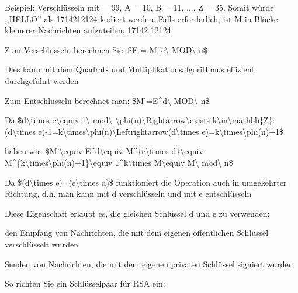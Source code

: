 \documentclass[a4paper]{article}
\begin{document}
\begin{multicols}{3}
\begin{itemize*}
            \begin{itemize*}
                  \item Beispiel: Verschlüsseln mit = 99, A = 10, B = 11, ..., Z = 35. Somit würde ,,HELLO'' als 1714212124 kodiert werden. Falls erforderlich, ist M in Blöcke kleinerer Nachrichten aufzuteilen: 17142 12124
            \end{itemize*}
            \item
            Zum Verschlüsseln berechnen Sie: \$E = M\^{}e\textbackslash{}
            MOD\textbackslash{} n\$

            \begin{itemize*}
                  \item Dies kann mit dem Quadrat- und Multiplikationsalgorithmus effizient durchgeführt werden
            \end{itemize*}
            \item
            Zum Entschlüsseln berechnet man: \$M'=E\^{}d\textbackslash{}
            MOD\textbackslash{} n\$

            \begin{itemize*}
                  \item Da \$d\textbackslash times e\textbackslash equiv 1\textbackslash{} mod\textbackslash{} \textbackslash phi(n)\textbackslash Rightarrow\textbackslash exists k\textbackslash in\textbackslash mathbb\{Z\}:(d\textbackslash times e)-1=k\textbackslash times\textbackslash phi(n)\textbackslash Leftrightarrow(d\textbackslash times e)=k\textbackslash times\textbackslash phi(n)+1\$
                  \item haben wir: \$M'\textbackslash equiv E\^{}d\textbackslash equiv M\^{}\{e\textbackslash times d\}\textbackslash equiv M\^{}\{k\textbackslash times\textbackslash phi(n)+1\}\textbackslash equiv 1\^{}k\textbackslash times M\textbackslash equiv M\textbackslash{} mod\textbackslash{} n\$
            \end{itemize*}
            \item
            Da \$(d\textbackslash times e)=(e\textbackslash times d)\$
            funktioniert die Operation auch in umgekehrter Richtung, d.h. man kann
            mit d verschlüsseln und mit e entschlüsseln

            \begin{itemize*}
                  \item Diese Eigenschaft erlaubt es, die gleichen Schlüssel d und e zu verwenden:
                  \item den Empfang von Nachrichten, die mit dem eigenen öffentlichen Schlüssel verschlüsselt wurden
                  \item Senden von Nachrichten, die mit dem eigenen privaten Schlüssel signiert wurden
            \end{itemize*}
            \item
            So richten Sie ein Schlüsselpaar für RSA ein:


\end{itemize*}
\end{multicols}
\end{document}
